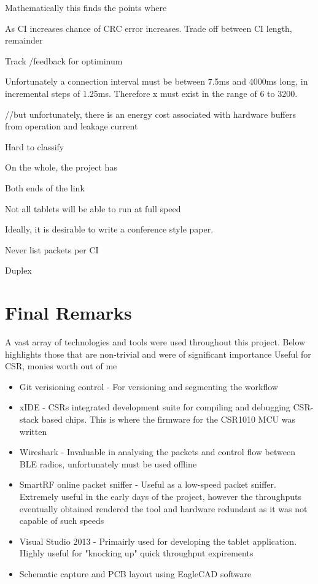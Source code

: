 \documentclass[]{article}
\begin{document}
Mathematically this finds the points where 

As CI increases chance of CRC error increases. Trade off between CI length, remainder

Track /feedback for optiminum 

Unfortunately a connection interval must be between 7.5ms and 4000ms long, in incremental steps of 1.25ms. Therefore x must exist in the range of 6 to 3200. 

//but unfortunately, there is an energy cost associated with hardware buffers from operation and leakage current

Hard to classify

On the whole, the project has 

Both ends of the link 

Not all tablets will be able to run at full speed

Ideally, it is desirable to write a conference style paper. 

Never list packets per CI

Duplex

\section{Final Remarks}
A vast array of technologies and tools were used throughout this project. Below highlights those that are non-trivial and were of significant importance
Useful for CSR, monies worth out of me

\begin{itemize}
	\item Git verisioning control - For versioning and segmenting the workflow
	\item xIDE - CSRs integrated development suite for compiling and debugging CSR-stack based chips. This is where the firmware for the CSR1010 MCU was written
	\item Wireshark - Invaluable in analysing the packets and control flow between BLE radios, unfortunately must be used offline
	\item SmartRF online packet sniffer - Useful as a low-speed packet sniffer. Extremely useful in the early days of the project, however the throughputs eventually obtained rendered the tool and hardware redundant as it was not capable of such speeds
	\item Visual Studio 2013 - Primairly used for developing the tablet application. Highly useful for "knocking up" quick throughput expirements 
	\item Schematic capture and \ac{PCB} layout using EagleCAD software
\end{itemize}
\end{document}
